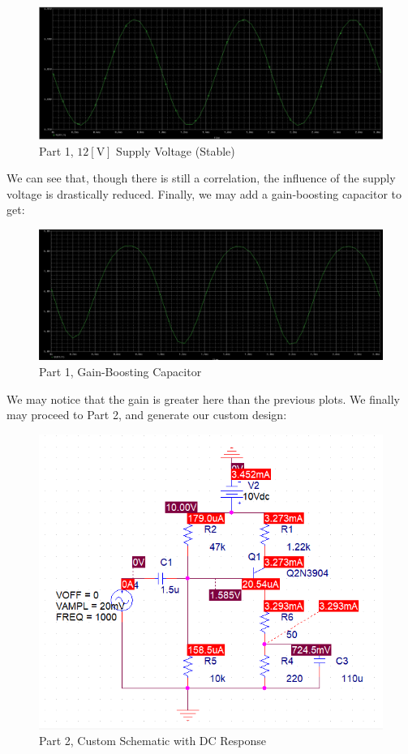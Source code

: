 \documentclass[
	letterpaper, %
	10pt, %
]{CSUniSchoolLabReport}
\begin{document}
\begin{figure}[H]
  \centering
  \includegraphics[width=.8\textwidth]{Figures/L4F16}
  \caption{Part 1, $12[\si{\volt}]$ Supply Voltage (Stable)}
  \label{fig:18}
\end{figure}

We can see that, though there is still a correlation, the influence of the supply voltage is drastically reduced. Finally, we may add a gain-boosting capacitor to get:

\begin{figure}[H]
  \centering
  \includegraphics[width=.8\textwidth]{Figures/L4F17}
  \caption{Part 1, Gain-Boosting Capacitor}
  \label{fig:19}
\end{figure}

We may notice that the gain is greater here than the previous plots. We finally may proceed to Part 2, and generate our custom design:

\begin{figure}[H]
  \centering
  \includegraphics[width=.8\textwidth]{Figures/L4F18}
  \caption{Part 2, Custom Schematic with DC Response}
  \label{fig:20}
\end{figure}
\end{document}
